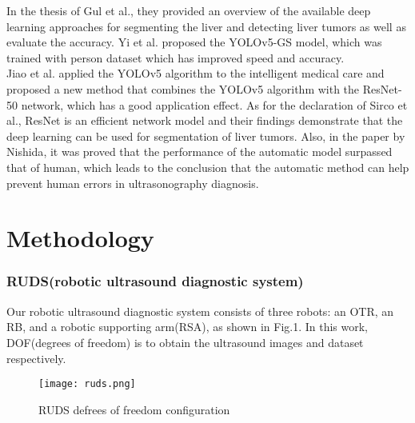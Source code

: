 \documentclass[12pt, a4paper]{article}
\begin{document}
\setlength{\parindent}{1em}
In the thesis of Gul et al.\cite{8}, they provided an overview of the available deep learning approaches for segmenting the liver and detecting liver tumors as well as evaluate the accuracy.
Yi et al.\cite{9} proposed the YOLOv5-GS model, which was trained with person dataset which has improved speed and accuracy.\\

\setlength{\parindent}{1em}
Jiao et al.\cite{10} applied the YOLOv5 algorithm to the intelligent medical care and proposed a new method that combines the YOLOv5 algorithm with the ResNet-50 network, which has a good application effect. As for the declaration of Sirco et al.\cite{11}, ResNet is an efficient network model and their findings demonstrate that the deep learning can be used for segmentation of liver tumors. Also, in the paper by Nishida\cite{12}, it was proved that the performance of the automatic model surpassed that of human, which leads to the conclusion that the automatic method can help prevent human errors in ultrasonography diagnosis.


\section{Methodology}





\subsubsection*{RUDS(robotic ultrasound diagnostic system)}
Our robotic ultrasound diagnostic system\cite{13} consists of three robots: an OTR, an RB, and a robotic supporting arm(RSA), as shown in Fig.1.
In this work, DOF(degrees of freedom) is to obtain the ultrasound images and dataset respectively.

\begin{figure}[htb]
    \centering
    \texttt{[image: ruds.png]}
    \caption{RUDS defrees of freedom configuration}
\end{figure}
\end{document}
